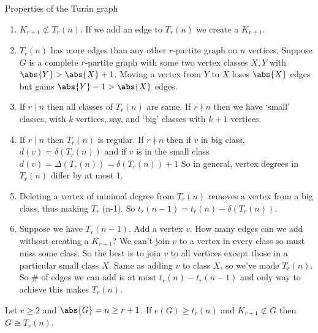 \documentclass{article}
\begin{document}
Properties of the Tur\'{a}n graph
\begin{enumerate}
    \item $K_{r+1} \not\subset T_r(n)$. If we add an edge to $T_r(n)$ we create a $K_{r+1}$.
    \item $T_r(n)$ has more edges than any other $r$-partite graph on $n$ vertices. Suppose $G$ is a complete $r$-partite graph with some two vertex classes $X, Y$ with $\abs{Y} > \abs{X}+1$.
        Moving a vertex from $Y$ to $X$ loses $\abs{X}$ edges but gains $\abs{Y}-1 > \abs{X}$ edges.
    \item If $r \mid n$ then all classes of $T_r(n)$ are same.
        If $r \nmid n$ then we have `small' classes, with $k$ vertices, say, and `big' classes with $k+1$ vertices.
    \item If $r \mid n$ then $T_r(n)$ is regular.
        If $r \nmid n$ then if $v$ in big class, $d(v) = \delta(T_r(n))$ and if $v$ is in the small class $d(v) = \Delta(T_r(n)) = \delta(T_r(n)) + 1$
        So in general, vertex degrees in $T_r(n)$ differ by at most 1.
    \item Deleting a vertex of minimal degree from $T_r(n)$ removes a vertex from a big class, thus making $T_r$ (n-1).
        So $t_r(n-1) = t_r(n) - \delta(T_r(n))$.
    \item Suppose we have $T_r(n-1)$. Add a vertex $v$. How many edges can we add without creating a $K_{r+1}$? We can't join $v$ to a vertex in every class so must miss some class.
        So the best is to join $v$ to all vertices except those in a particular small class $X$.
        Same as adding $v$ to class $X$, so we've made $T_r(n)$. So \# of edges we can add is at most $t_r(n) - t_r(n-1)$ and only way to achieve this makes $T_r(n)$.
\end{enumerate}

\begin{nthm}
    Let $r \geq 2$ and $\abs{G} = n \geq r+1$. If $e(G) \geq t_r(n)$ and $K_{r+1} \not\subset G$ then $G \cong T_r(n)$.
\end{nthm}
\end{document}
